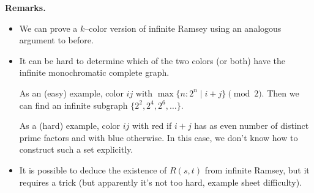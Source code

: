 \documentclass{article}
\theoremstyle{definition}
\begin{document}

\textbf{Remarks.} 
\begin{itemize}
    \item We can prove a $k$--color version of infinite Ramsey using an analogous argument to before.
    \item It can be hard to determine which of the two colors (or both) have the infinite monochromatic complete graph. 
    
    As an (easy) example, color $ij$ with $\max \{n : 2^n \mid i+j\}\pmod{2}$. Then we can find an infinite subgraph $\{2^2,2^4,2^6,\ldots\}$.

    As a (hard) example, color $ij$ with red if $i+j$ has as even number of distinct prime factors and with blue otherwise. In this case, we don't know how to construct such a set explicitly. 
    \item It is possible to deduce the existence of $R(s,t)$ from infinite Ramsey, but it requires a trick (but apparently it's not too hard, example sheet difficulty).
\end{itemize} 
\end{document}
